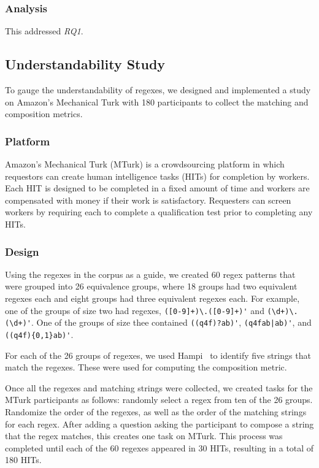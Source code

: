 \subsubsection{Analysis}
\label{communityanalysis}
This addressed \emph{RQ1}. 

\subsection{Understandability Study}
To gauge the understandability of regexes, we designed and implemented a study on Amazon's Mechanical Turk with 180 participants to collect the matching and composition metrics. 

\subsubsection{Platform}
Amazon's Mechanical Turk (MTurk) is a crowdsourcing platform in which requestors can create human intelligence tasks (HITs) for completion by workers. Each HIT is designed to be completed in a fixed amount of time and workers are compensated with money if their work is satisfactory. Requesters can screen workers by requiring each to complete a qualification test prior to completing any HITs. 

\subsubsection{Design}
Using the regexes in the corpus as a guide, we created 60 regex patterns that were grouped into 26 equivalence groups, where 18 groups had two equivalent regexes each and eight groups had three equivalent regexes each. For example, one of the groups of size two had regexes, \verb!([0-9]+)\.([0-9]+)'! and \verb!(\d+)\.(\d+)'!. One of the groups of size thee contained \verb!((q4f)?ab)'!, \verb!(q4fab|ab)'!, and \verb!((q4f){0,1}ab)'!. 

For each of the 26 groups of regexes, we used Hampi~\cite{hampi} to identify five strings that match the regexes. These were used for computing the composition metric. 

Once all the regexes and matching strings were collected, we created tasks for the MTurk participants as follows: randomly select a regex from ten of the 26 groups. Randomize the order of the regexes, as well as the order of the matching strings for each regex. After adding a question asking the participant to compose a string that the regex matches, this creates one task on MTurk. This process was completed until each of the 60 regexes appeared in 30 HITs, resulting in a total of 180 HITs. 

